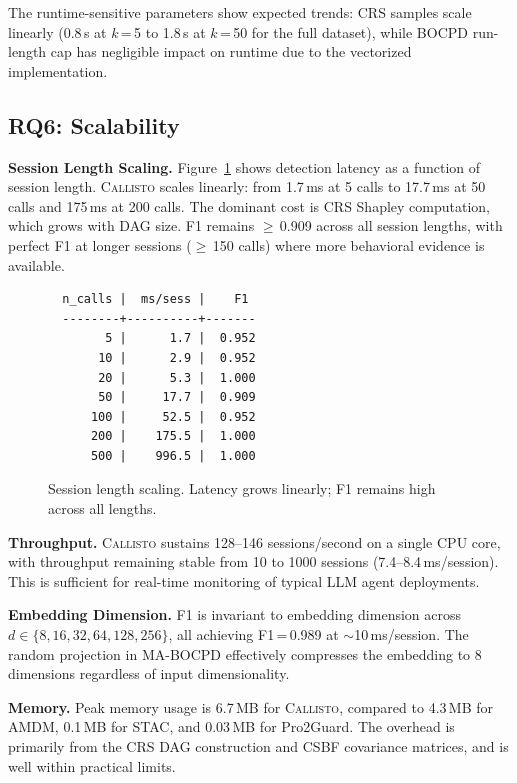 \documentclass[conference,compsoc]{IEEEtran}
\newcommand{\system}{\textsc{Callisto}}
\begin{document}
The runtime-sensitive parameters show expected trends: CRS samples scale linearly (0.8\,s at $k$\,=\,5 to 1.8\,s at $k$\,=\,50 for the full dataset), while BOCPD run-length cap has negligible impact on runtime due to the vectorized implementation.

\subsection{RQ6: Scalability}
\label{sec:scalability}

\textbf{Session Length Scaling.} Figure~\ref{fig:scaling} shows detection latency as a function of session length. \system{} scales linearly: from 1.7\,ms at 5 calls to 17.7\,ms at 50 calls and 175\,ms at 200 calls. The dominant cost is CRS Shapley computation, which grows with DAG size. F1 remains $\geq$\,0.909 across all session lengths, with perfect F1 at longer sessions ($\geq$\,150 calls) where more behavioral evidence is available.

\begin{figure}[t]
\centering
\small
\begin{verbatim}
  n_calls |  ms/sess |    F1
  --------+----------+-------
        5 |      1.7 |  0.952
       10 |      2.9 |  0.952
       20 |      5.3 |  1.000
       50 |     17.7 |  0.909
      100 |     52.5 |  0.952
      200 |    175.5 |  1.000
      500 |    996.5 |  1.000
\end{verbatim}
\caption{Session length scaling. Latency grows linearly; F1 remains high across all lengths.}
\label{fig:scaling}
\end{figure}

\textbf{Throughput.} \system{} sustains 128--146 sessions/second on a single CPU core, with throughput remaining stable from 10 to 1000 sessions (7.4--8.4\,ms/session). This is sufficient for real-time monitoring of typical LLM agent deployments.

\textbf{Embedding Dimension.} F1 is invariant to embedding dimension across $d \in \{8, 16, 32, 64, 128, 256\}$, all achieving F1\,=\,0.989 at $\sim$10\,ms/session. The random projection in MA-BOCPD effectively compresses the embedding to 8 dimensions regardless of input dimensionality.

\textbf{Memory.} Peak memory usage is 6.7\,MB for \system{}, compared to 4.3\,MB for AMDM, 0.1\,MB for STAC, and 0.03\,MB for Pro2Guard. The overhead is primarily from the CRS DAG construction and CSBF covariance matrices, and is well within practical limits.
\end{document}
